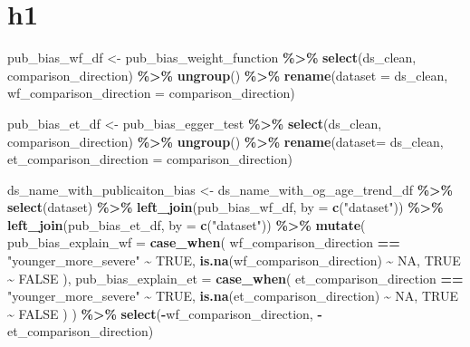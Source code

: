 \documentclass[
]{article}
\newenvironment{Shaded}{\begin{snugshade}}{\end{snugshade}}
\newcommand{\AttributeTok}[1]{\textcolor[rgb]{0.13,0.29,0.53}{#1}}
\newcommand{\ConstantTok}[1]{\textcolor[rgb]{0.56,0.35,0.01}{#1}}
\newcommand{\FunctionTok}[1]{\textcolor[rgb]{0.13,0.29,0.53}{\textbf{#1}}}
\newcommand{\NormalTok}[1]{#1}
\newcommand{\OtherTok}[1]{\textcolor[rgb]{0.56,0.35,0.01}{#1}}
\newcommand{\SpecialCharTok}[1]{\textcolor[rgb]{0.81,0.36,0.00}{\textbf{#1}}}
\newcommand{\StringTok}[1]{\textcolor[rgb]{0.31,0.60,0.02}{#1}}
\begin{document}
\hypertarget{h1}{%
\section{h1}\label{h1}}

\begin{Shaded}
\begin{Highlighting}[]
\NormalTok{pub\_bias\_wf\_df }\OtherTok{\textless{}{-}}\NormalTok{ pub\_bias\_weight\_function }\SpecialCharTok{\%\textgreater{}\%} 
  \FunctionTok{select}\NormalTok{(ds\_clean, comparison\_direction) }\SpecialCharTok{\%\textgreater{}\%} 
  \FunctionTok{ungroup}\NormalTok{() }\SpecialCharTok{\%\textgreater{}\%} 
  \FunctionTok{rename}\NormalTok{(}\AttributeTok{dataset =}\NormalTok{ ds\_clean, }
         \AttributeTok{wf\_comparison\_direction =}\NormalTok{ comparison\_direction)}

\NormalTok{pub\_bias\_et\_df }\OtherTok{\textless{}{-}}\NormalTok{ pub\_bias\_egger\_test }\SpecialCharTok{\%\textgreater{}\%} 
  \FunctionTok{select}\NormalTok{(ds\_clean, comparison\_direction) }\SpecialCharTok{\%\textgreater{}\%} 
  \FunctionTok{ungroup}\NormalTok{() }\SpecialCharTok{\%\textgreater{}\%} 
  \FunctionTok{rename}\NormalTok{(}\AttributeTok{dataset=}\NormalTok{ ds\_clean, }
         \AttributeTok{et\_comparison\_direction =}\NormalTok{ comparison\_direction)}

\NormalTok{ds\_name\_with\_publicaiton\_bias }\OtherTok{\textless{}{-}}\NormalTok{ ds\_name\_with\_og\_age\_trend\_df }\SpecialCharTok{\%\textgreater{}\%} 
  \FunctionTok{select}\NormalTok{(dataset) }\SpecialCharTok{\%\textgreater{}\%} 
  \FunctionTok{left\_join}\NormalTok{(pub\_bias\_wf\_df, }\AttributeTok{by =} \FunctionTok{c}\NormalTok{(}\StringTok{"dataset"}\NormalTok{)) }\SpecialCharTok{\%\textgreater{}\%} 
  \FunctionTok{left\_join}\NormalTok{(pub\_bias\_et\_df, }\AttributeTok{by =} \FunctionTok{c}\NormalTok{(}\StringTok{"dataset"}\NormalTok{)) }\SpecialCharTok{\%\textgreater{}\%} 
  \FunctionTok{mutate}\NormalTok{(}
    \AttributeTok{pub\_bias\_explain\_wf =} \FunctionTok{case\_when}\NormalTok{(}
\NormalTok{      wf\_comparison\_direction }\SpecialCharTok{==} \StringTok{"younger\_more\_severe"} \SpecialCharTok{\textasciitilde{}} \ConstantTok{TRUE}\NormalTok{, }
      \FunctionTok{is.na}\NormalTok{(wf\_comparison\_direction) }\SpecialCharTok{\textasciitilde{}} \ConstantTok{NA}\NormalTok{,}
      \ConstantTok{TRUE} \SpecialCharTok{\textasciitilde{}} \ConstantTok{FALSE}
\NormalTok{    ),}
    \AttributeTok{pub\_bias\_explain\_et =} \FunctionTok{case\_when}\NormalTok{(}
\NormalTok{      et\_comparison\_direction }\SpecialCharTok{==} \StringTok{"younger\_more\_severe"} \SpecialCharTok{\textasciitilde{}} \ConstantTok{TRUE}\NormalTok{, }
      \FunctionTok{is.na}\NormalTok{(et\_comparison\_direction) }\SpecialCharTok{\textasciitilde{}} \ConstantTok{NA}\NormalTok{,}
      \ConstantTok{TRUE} \SpecialCharTok{\textasciitilde{}} \ConstantTok{FALSE}
\NormalTok{    )}
\NormalTok{  ) }\SpecialCharTok{\%\textgreater{}\%} 
  \FunctionTok{select}\NormalTok{(}\SpecialCharTok{{-}}\NormalTok{wf\_comparison\_direction, }\SpecialCharTok{{-}}\NormalTok{et\_comparison\_direction)}
  

\end{Highlighting}
\end{Shaded}
\end{document}
